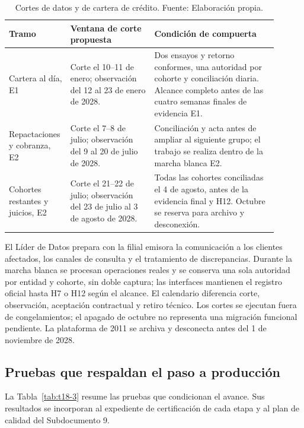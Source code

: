 \documentclass[11pt]{article}
\begin{document}
\begin{longtable}{@{}p{0.16\linewidth}p{0.30\linewidth}p{0.44\linewidth}@{}}
\caption[Cortes de datos y de cartera de crédito]{Cortes de datos y de cartera de crédito. Fuente: Elaboración propia.}\label{tab:t18-2}\\
\toprule
\textbf{Tramo} & \textbf{Ventana de corte propuesta} & \textbf{Condición de compuerta} \\
\midrule
\endhead
\bottomrule
\endlastfoot
Cartera al día, E1 & Corte el 10--11 de enero; observación del 12 al 23 de enero de 2028. & Dos ensayos y retorno conformes, una autoridad por cohorte y conciliación diaria. Alcance completo antes de las cuatro semanas finales de evidencia E1. \\
Repactaciones y cobranza, E2 & Corte el 7--8 de julio; observación del 9 al 20 de julio de 2028. & Conciliación y acta antes de ampliar al siguiente grupo; el trabajo se realiza dentro de la marcha blanca E2. \\
Cohortes restantes y juicios, E2 & Corte el 21--22 de julio; observación del 23 de julio al 3 de agosto de 2028. & Todas las cohortes conciliadas el 4 de agosto, antes de la evidencia final y H12. Octubre se reserva para archivo y desconexión. \\
\end{longtable}

El Líder de Datos prepara con la filial emisora la comunicación a los clientes afectados, los canales de consulta y el tratamiento de discrepancias. Durante la marcha blanca se procesan operaciones reales y se conserva una sola autoridad por entidad y cohorte, sin doble captura; las interfaces mantienen el registro oficial hasta H7 o H12 según el alcance. El calendario diferencia corte, observación, aceptación contractual y retiro técnico. Los cortes se ejecutan fuera de congelamientos; el apagado de octubre no representa una migración funcional pendiente. La plataforma de 2011 se archiva y desconecta antes del 1 de noviembre de 2028.

\subsection*{Pruebas que respaldan el paso a producción}

La Tabla~\ref{tab:t18-3} resume las pruebas que condicionan el avance. Sus resultados se incorporan al expediente de certificación de cada etapa y al plan de calidad del Subdocumento 9.
\end{document}

